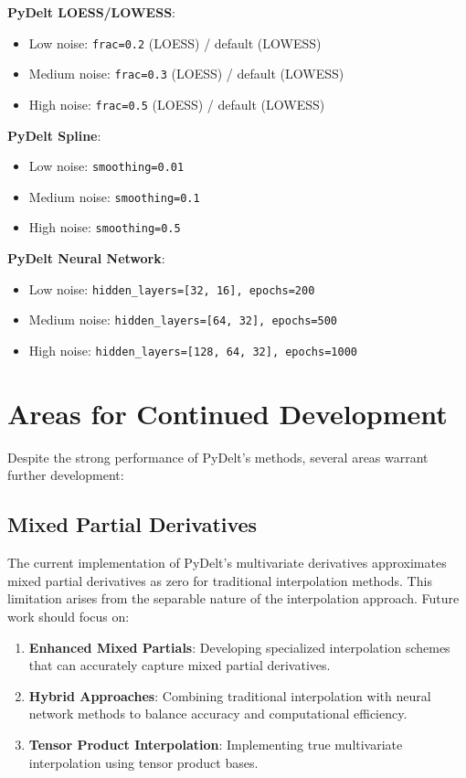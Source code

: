 \documentclass[conference]{IEEEtran}
\begin{document}
\textbf{PyDelt LOESS/LOWESS}:
\begin{itemize}
\item Low noise: \texttt{frac=0.2} (LOESS) / default (LOWESS)
\item Medium noise: \texttt{frac=0.3} (LOESS) / default (LOWESS)
\item High noise: \texttt{frac=0.5} (LOESS) / default (LOWESS)
\end{itemize}

\textbf{PyDelt Spline}:
\begin{itemize}
\item Low noise: \texttt{smoothing=0.01}
\item Medium noise: \texttt{smoothing=0.1}
\item High noise: \texttt{smoothing=0.5}
\end{itemize}

\textbf{PyDelt Neural Network}:
\begin{itemize}
\item Low noise: \texttt{hidden\_layers=[32, 16], epochs=200}
\item Medium noise: \texttt{hidden\_layers=[64, 32], epochs=500}
\item High noise: \texttt{hidden\_layers=[128, 64, 32], epochs=1000}
\end{itemize}

\section{Areas for Continued Development}

Despite the strong performance of PyDelt's methods, several areas warrant further development:

\subsection{Mixed Partial Derivatives}

The current implementation of PyDelt's multivariate derivatives approximates mixed partial derivatives as zero for traditional interpolation methods. This limitation arises from the separable nature of the interpolation approach. Future work should focus on:

\begin{enumerate}
\item \textbf{Enhanced Mixed Partials}: Developing specialized interpolation schemes that can accurately capture mixed partial derivatives.
\item \textbf{Hybrid Approaches}: Combining traditional interpolation with neural network methods to balance accuracy and computational efficiency.
\item \textbf{Tensor Product Interpolation}: Implementing true multivariate interpolation using tensor product bases.
\end{enumerate}
\end{document}
